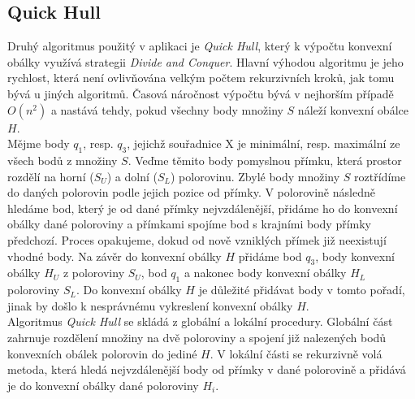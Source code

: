 \documentclass[a4paper, 12pt]{article}
\begin{document}
\subsection{Quick Hull}
Druhý algoritmus použitý v aplikaci je \textit{Quick Hull}, který k výpočtu konvexní obálky využívá strategii \textit{Divide and Conquer}. Hlavní výhodou algoritmu je jeho rychlost, která není ovlivňována velkým počtem rekurzivních kroků, jak tomu bývá u jiných algoritmů. Časová náročnost výpočtu bývá v nejhorším případě $O(n^2)$ a nastává tehdy, pokud všechny body množiny $S$ náleží konvexní obálce $H$.\\

Mějme body $q_1$, resp. $q_3$, jejichž souřadnice X je minimální, resp. maximální ze všech bodů z množiny $S$. Veďme těmito body pomyslnou přímku, která prostor rozdělí na horní ($S_U$) a dolní ($S_L$) polorovinu. Zbylé body množiny $S$ roztřídíme do daných polorovin podle jejich pozice od přímky. V polorovině následně hledáme bod, který je od dané přímky nejvzdálenější, přidáme ho do konvexní obálky dané poloroviny a přímkami spojíme bod s krajními body přímky předchozí. Proces opakujeme, dokud od nově vzniklých přímek již neexistují vhodné body. Na závěr do konvexní obálky $H$ přidáme bod $q_3$, body konvexní obálky $H_U$ z poloroviny $S_U$, bod $q_1$ a nakonec body konvexní obálky $H_L$ poloroviny $S_L$. Do konvexní obálky $H$ je důležité přidávat body v tomto pořadí, jinak by došlo k nesprávnému vykreslení konvexní obálky $H$. \\

Algoritmus \textit{Quick Hull} se skládá z globální a lokální procedury. Globální část zahrnuje rozdělení množiny na dvě poloroviny a spojení již nalezených bodů konvexních obálek polorovin do jediné $H$. V lokální části se rekurzivně volá metoda, která hledá nejvzdálenější body od přímky v dané polorovině a přidává je do konvexní obálky dané poloroviny $H_i$.\\
\end{document}

